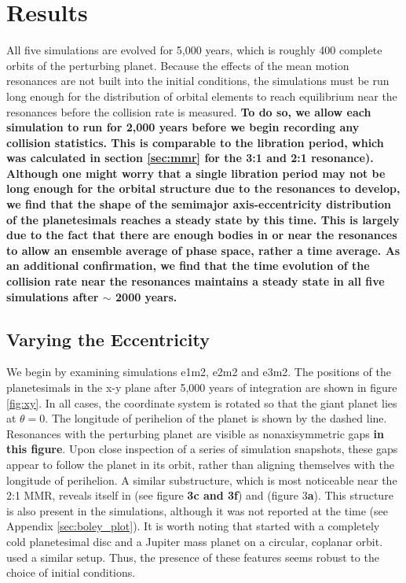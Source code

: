 \documentclass[fleqn,usenatbib]{mnras}
\begin{document}
\section{Results} \label{sec:results}

All five simulations are evolved for 5,000 years, which is roughly 400 complete orbits of the perturbing planet. Because the effects of the mean 
motion resonances are not built into the initial conditions, the simulations must be run long enough for the distribution of orbital elements to reach 
equilibrium near the resonances before the collision rate is measured. \textbf{To do so, we allow each simulation to run for 2,000 years before we begin recording any collision statistics. This is comparable to the libration period, which was calculated in section \ref{sec:mmr} for the 3:1 and 2:1 resonance). Although one might worry that a single libration period may not be long enough for the orbital structure due to the resonances to develop, we find that the shape of the semimajor axis-eccentricity distribution of the planetesimals reaches a steady state by this time. This is largely due to the fact that there are enough bodies in or near the resonances to allow an ensemble average of phase space, rather a time average. As an additional confirmation, we find that the time evolution of the collision rate near the resonances maintains a steady state in all five simulations after $\sim$ 2000 years.}

\subsection{Varying the Eccentricity} \label{sec:vary_ecc}

We begin by examining simulations e1m2, e2m2 and e3m2. The positions of the planetesimals in the x-y plane after 5,000 years of integration are 
shown in figure \ref{fig:xy}. In all cases, the coordinate system is rotated so that the giant planet lies at $\theta = 0$. The longitude of perihelion of 
the planet is shown by the dashed line. Resonances with the perturbing planet are visible as nonaxisymmetric gaps \textbf{in this figure}. Upon close inspection of a 
series of simulation snapshots, these gaps appear to follow the planet in its orbit, rather than aligning themselves with the longitude of perihelion. A 
similar substructure, which is most noticeable near the 2:1 MMR, reveals itself in \citet{2000Icar..143...45R} (see figure \textbf{3c and 3f}) and 
\citet{2016ApJ...818..159T} (figure 3\textbf{a}). This structure is also present in the \citet{2017ApJ...850..103B} simulations, although it was not reported at the 
time (see Appendix \ref{sec:boley_plot}). It is worth noting that \citet{2000Icar..143...45R} started with a completely cold planetesimal disc and a 
Jupiter mass planet on a circular, coplanar
orbit. \citet{2017ApJ...850..103B} used a similar setup.
Thus, the presence of these features seems robust 
to the choice of initial conditions.
\end{document}
